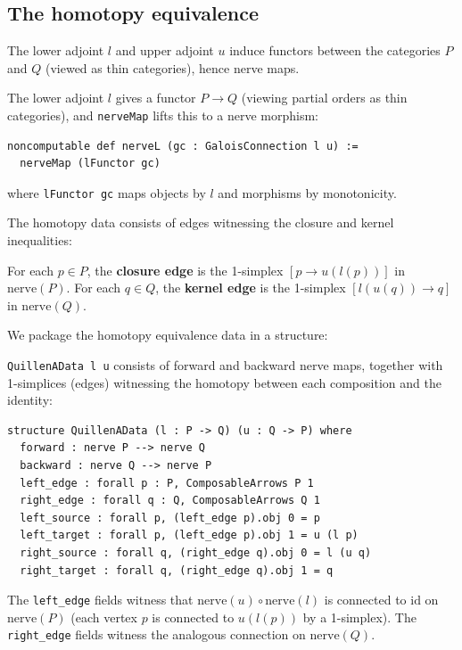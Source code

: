 \documentclass[11pt]{article}
\newcommand{\nerve}{\mathrm{nerve}}
\begin{document}
\subsection{The homotopy equivalence}

The lower adjoint $l$ and upper adjoint $u$ induce functors between the
categories $P$ and $Q$ (viewed as thin categories), hence nerve maps.

The lower adjoint $l$ gives a functor $P \to Q$ (viewing partial orders as
thin categories), and \texttt{nerveMap} lifts this to a nerve morphism:
\begin{lstlisting}
noncomputable def nerveL (gc : GaloisConnection l u) :=
  nerveMap (lFunctor gc)
\end{lstlisting}
where \texttt{lFunctor gc} maps objects by $l$ and morphisms by monotonicity.

The homotopy data consists of edges witnessing the closure and kernel
inequalities:

\begin{definition}\label{def:edges}
For each $p \in P$, the \textbf{closure edge} is the 1-simplex
$[p \to u(l(p))]$ in $\nerve(P)$. For each $q \in Q$, the \textbf{kernel
edge} is the 1-simplex $[l(u(q)) \to q]$ in $\nerve(Q)$.
\end{definition}

We package the homotopy equivalence data in a structure:

\begin{definition}\label{def:quillen-data}
\texttt{QuillenAData l u} consists of forward and backward nerve maps, together
with 1-simplices (edges) witnessing the homotopy between each composition and
the identity:
\begin{lstlisting}
structure QuillenAData (l : P -> Q) (u : Q -> P) where
  forward : nerve P --> nerve Q
  backward : nerve Q --> nerve P
  left_edge : forall p : P, ComposableArrows P 1
  right_edge : forall q : Q, ComposableArrows Q 1
  left_source : forall p, (left_edge p).obj 0 = p
  left_target : forall p, (left_edge p).obj 1 = u (l p)
  right_source : forall q, (right_edge q).obj 0 = l (u q)
  right_target : forall q, (right_edge q).obj 1 = q
\end{lstlisting}
The \texttt{left\_edge} fields witness that $\nerve(u) \circ \nerve(l)$ is
connected to $\mathrm{id}$ on $\nerve(P)$ (each vertex $p$ is connected to
$u(l(p))$ by a 1-simplex). The \texttt{right\_edge} fields witness the
analogous connection on $\nerve(Q)$.
\end{definition}
\end{document}
